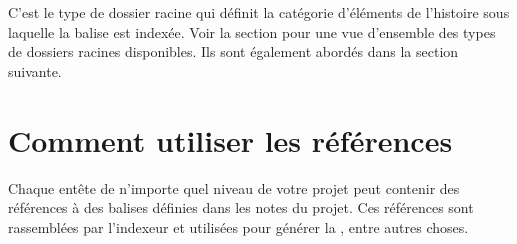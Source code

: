 \documentclass[a4paper,11pt,french]{sphinxmanual}
\begin{document}
\sphinxAtStartPar
C’est le type de dossier racine qui définit la catégorie d’éléments de l’histoire sous laquelle la balise est indexée. Voir la section {\hyperref[\detokenize{project_overview:a-proj-roots}]{}} pour une vue d’ensemble des types de dossiers racines disponibles. Ils sont également abordés dans la section suivante.


\section{Comment utiliser les références}
\label{\detokenize{project_references:how-to-use-references}}\label{\detokenize{project_references:a-references-references}}
\sphinxAtStartPar
Chaque en\sphinxhyphen{}tête de n’importe quel niveau de votre projet peut contenir des références à des balises définies dans les notes du projet. Ces références sont rassemblées par l’indexeur et utilisées pour générer la , entre autres choses.
\end{document}
